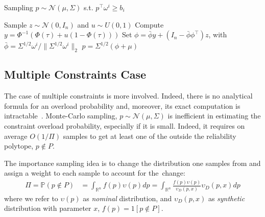 \begin{algorithm}[H]
    \caption{Sampling $p\sim \mathcal{N}(\mu,\Sigma)$ s.t. $p^\top \omega^i \geq b_i$}
    \label{alg:sample1d}
    Sample $z \sim \mathcal{N}(0, I_n)$ and $u \sim U(0,1)$\;
    Compute $y = \Phi^{-1}(\Phi(\tau) + u(1 - \Phi(\tau)))$\;
    Set $\phi = \bar\phi y + (I_n - \bar\phi\phi^\top) z$, with $\bar\phi = \Sigma^{1/2} \omega^i / \|\Sigma^{1/2} \omega^i\|_2$\!\! \;
    \Return $p = \Sigma^{1/2} (\phi+\mu)$
\end{algorithm}

 
 \subsection{Multiple Constraints Case}
 
The case of multiple constraints is more involved. Indeed, there is no analytical formula for an overload probability and, moreover, its exact computation is intractable~\cite{khachiyan1989problem}. 
Monte-Carlo sampling, $p\sim \mathcal{N}(\mu, \Sigma)$ is inefficient in estimating the constraint overload probability, especially if it is small. Indeed, it requires on average $O(1/\Pi)$ samples to get at least one of the outside the reliability polytope, $p\not\in P$. 

The importance sampling idea is to change the distribution one samples from and assign a weight to each sample to account for the~change: 
\begin{align*}
    \Pi  = \mathbb{P}(p\not\in P) & = \int_{\mathbb{R}^n} f(p) \upsilon(p) dp = \!\int_{\mathbb{R}^n}\!\! \frac{f(p)\upsilon(p)}{\upsilon_D(p,x)}\upsilon_D(p,x) dp%
\end{align*}
where we refer to $\upsilon(p)$ as \emph{nominal} distribution, and $\upsilon_D(p,x)$ as \emph{synthetic} distribution with parameter $x$,  $f(p) = 1[p\not\in P]$. 

